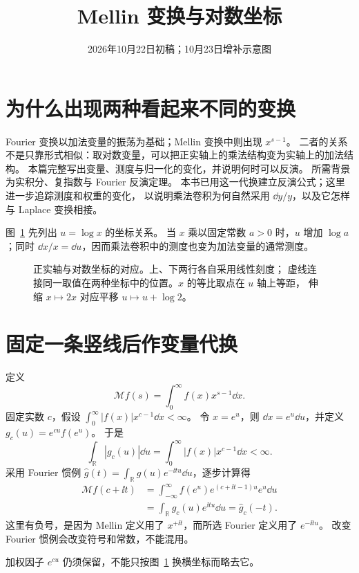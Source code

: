 \documentclass[UTF8,fontset=fandol,11pt]{ctexart}
\date{2026年10月22日初稿；10月23日增补示意图}
\title{Mellin 变换与对数坐标}
\begin{document}
\maketitle
\draftnotice
\section{为什么出现两种看起来不同的变换}
Fourier 变换以加法变量的振荡为基础；Mellin 变换中则出现 $x^{s-1}$。
二者的关系不是只靠形式相似：取对数变量，可以把正实轴上的乘法结构变为实轴上的加法结构。
本篇完整写出变量、测度与归一化的变化，并说明何时可以反演。
所需背景为实积分、复指数与 Fourier 反演定理。
本书已用这一代换建立反演公式；这里进一步追踪测度和权重的变化，
以说明乘法卷积为何自然采用 $\dd y/y$，以及它怎样与 Laplace 变换相接。

图~\ref{fig:log-coordinates} 先列出 $u=\log x$ 的坐标关系。
当 $x$ 乘以固定常数 $a>0$ 时，$u$ 增加 $\log a$；同时
$\dd x/x=\dd u$，因而乘法卷积中的测度也变为加法变量的通常测度。
\begin{figure}[htbp]
\centering

\caption{正实轴与对数坐标的对应。上、下两行各自采用线性刻度；
虚线连接同一取值在两种坐标中的位置。$x$ 的等比取点在 $u$ 轴上等距，
伸缩 $x\mapsto2x$ 对应平移 $u\mapsto u+\log2$。}
\label{fig:log-coordinates}
\end{figure}

\section{固定一条竖线后作变量代换}
定义
\[
 \mathcal Mf(s)=\int_0^\infty f(x)x^{s-1}\dd x.
\]
固定实数 $c$，假设 $\int_0^\infty |f(x)|x^{c-1}\dd x<\infty$。
令 $x=e^u$，则 $\dd x=e^u\dd u$，并定义 $g_c(u)=e^{cu}f(e^u)$。
于是
\[
 \int_{\mathbb R}|g_c(u)|\dd u
 =\int_0^\infty|f(x)|x^{c-1}\dd x<\infty.
\]
采用 Fourier 惯例
$\widehat g(t)=\int_{\mathbb R}g(u)e^{-\ii tu}\dd u$，逐步计算得
\[
\begin{aligned}
 \mathcal Mf(c+\ii t)
 &=\int_{-\infty}^{\infty}f(e^u)e^{(c+\ii t-1)u}e^u\dd u\\
 &=\int_{\mathbb R}g_c(u)e^{\ii tu}\dd u
 =\widehat g_c(-t).
\end{aligned}
\]
这里有负号，是因为 Mellin 定义用了 $x^{+\ii t}$，而所选 Fourier 定义用了 $e^{-\ii tu}$。
改变 Fourier 惯例会改变符号和常数，不能混用。

加权因子 $e^{cu}$ 仍须保留，不能只按图~\ref{fig:log-coordinates} 换横坐标而略去它。
\end{document}
